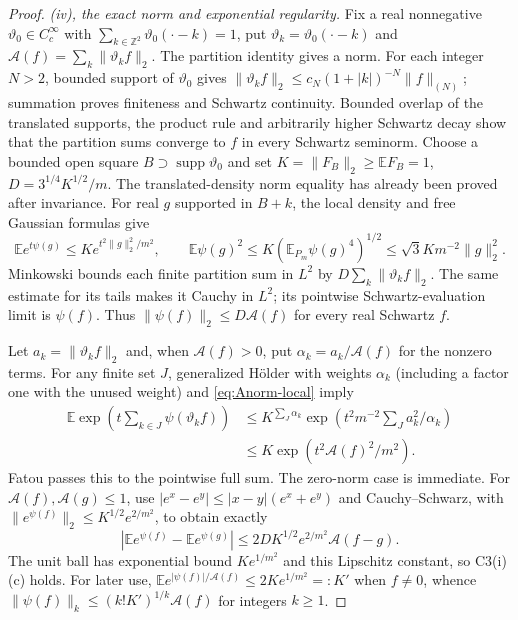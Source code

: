 \documentclass[11pt]{article}
\theoremstyle{plain}
\theoremstyle{definition}
\theoremstyle{remark}
\newcommand{\Z}{\mathbb{Z}}
\newcommand{\E}{\mathbb{E}}
\newcommand{\cA}{\mathcal{A}}
\DeclareMathOperator{\supp}{supp}
\begin{document}
\begin{proof}
\label{proof:CT-iv}
\emph{(iv), the exact norm and exponential regularity.}
Fix a real nonnegative $\vartheta_0\in C_c^\infty$ with
$\sum_{k\in\Z^2}\vartheta_0(\cdot-k)=1$, put
$\vartheta_k=\vartheta_0(\cdot-k)$ and
$\cA(f)=\sum_k\|\vartheta_kf\|_2$. The partition identity gives a norm.
For each integer $N>2$, bounded support of $\vartheta_0$ gives
$\|\vartheta_kf\|_2\le c_N(1+|k|)^{-N}\|f\|_{(N)}$; summation proves
finiteness and Schwartz continuity. Bounded overlap of the translated
supports, the product rule and arbitrarily higher Schwartz decay show
that the partition sums converge to $f$ in every Schwartz seminorm.
Choose a bounded open square $B\supset\supp\vartheta_0$ and set
$K=\|F_B\|_2\ge\E F_B=1$, $D=3^{1/4}K^{1/2}/m$.
The translated-density norm equality has already been proved after
invariance. For real $g$ supported in $B+k$, the local density and free
Gaussian formulas give
\begin{equation}\label{eq:Anorm-local}
 \E e^{t\psi(g)}\le K e^{t^2\|g\|_2^2/m^2},\qquad
 \E\psi(g)^2\le K(\E_{P_m}\psi(g)^4)^{1/2}
                  \le\sqrt3 K m^{-2}\|g\|_2^2.
\end{equation}
Minkowski bounds each finite partition sum in $L^2$ by
$D\sum_k\|\vartheta_kf\|_2$. The same estimate for its tails makes it
Cauchy in $L^2$; its pointwise Schwartz-evaluation limit is $\psi(f)$.
Thus $\|\psi(f)\|_2\le D\cA(f)$ for every real Schwartz $f$.

Let $a_k=\|\vartheta_kf\|_2$ and, when $\cA(f)>0$, put
$\alpha_k=a_k/\cA(f)$ for the nonzero terms. For any finite set $J$,
generalized H\"older with weights $\alpha_k$ (including a factor one with
the unused weight) and \eqref{eq:Anorm-local} imply
\begin{align*}
 \E\exp\left(t\sum_{k\in J}\psi(\vartheta_kf)\right)
 &\le K^{\sum_J\alpha_k}
       \exp\left(t^2m^{-2}\sum_J a_k^2/\alpha_k\right)\\
 &\le K\exp(t^2\cA(f)^2/m^2).
\end{align*}
Fatou passes this to the pointwise full sum. The zero-norm case is
immediate. For $\cA(f),\cA(g)\le1$, use
$|e^x-e^y|\le|x-y|(e^x+e^y)$ and Cauchy--Schwarz, with
$\|e^{\psi(f)}\|_2\le K^{1/2}e^{2/m^2}$, to obtain exactly
\begin{equation}\label{eq:Anorm-continuity}
 |\E e^{\psi(f)}-\E e^{\psi(g)}|
 \le2DK^{1/2}e^{2/m^2}\cA(f-g).
\end{equation}
The unit ball has exponential bound $Ke^{1/m^2}$ and this Lipschitz
constant, so C3(i)(c) holds. For later use,
$\E e^{|\psi(f)|/\cA(f)}\le2Ke^{1/m^2}=:K'$ when $f\ne0$, whence
$\|\psi(f)\|_k\le(k!K')^{1/k}\cA(f)$ for integers $k\ge1$.


\end{proof}
\end{document}
